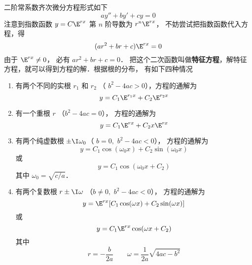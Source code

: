 

二阶常系数齐次微分方程形式如下
\begin{equation}
ay'' + by' + cy = 0
\end{equation}
注意到指数函数 $y = C{\E^{rx}}$ 第 $n$ 阶导数为 ${r^n}{\E^{rx}}$， 不妨尝试把指数函数代入方程，得
\begin{equation}
(a r^2 + br + c) \E^{rx} = 0
\end{equation}
由于 $\E^{rx} \ne 0$， 必有 $a r^2 + br + c = 0$． 把这个二次函数叫做\textbf{特征方程}，解特征方程，就可以得到方程的解．根据根的分布， 有如下四种情况

\begin{enumerate}
\item 有两个不同的实根 ${r_1}$ 和  ${r_2}$ （ ${b^2} - 4ac > 0$），方程的通解为
 \begin{equation}
y = C_1 \E^{r_1 x} + C_2 \E^{r_2 x}
\end{equation}
\item 有一个重根 $r$ （${b^2} - 4ac = 0$）， 方程的通解为
\begin{equation}\label{Ode2_eq4}
y = {C_1}{\E^{rx}} + {C_2}x{\E^{rx}}
\end{equation}
\item 有两个纯虚数根 $\pm \I \omega_0$（ $b = 0,\,\, b^2 - 4ac < 0$）， 方程的通解为
\begin{equation}
y = C_1\cos(\omega _0 x) + C_2 \sin(\omega _0 x)
\end{equation}
或 
\begin{equation}
y = C_1\cos(\omega _0 x + C_2)
\end{equation} 
其中 $\omega _0 = \sqrt {c/a}$． 

\item 有两个复数根 $r \pm \I\omega $ （${b \ne 0,\,\,{b^2} - 4ac < 0}$）， 方程的通解为
\begin{equation}\label{Ode2_eq7}
y = \E^{rx} [ C_1\cos(\omega x) + C_2\sin(\omega x) ]
\end{equation} 
或 
\begin{equation}
y = C_1\E^{rx}\cos(\omega x + C_2)
\end{equation} 
其中
\begin{equation}
r =  - \frac{b}{2a} \qquad \omega  = \frac{1}{2a}\sqrt {4ac - b^2} 
\end{equation}

\end{enumerate}

